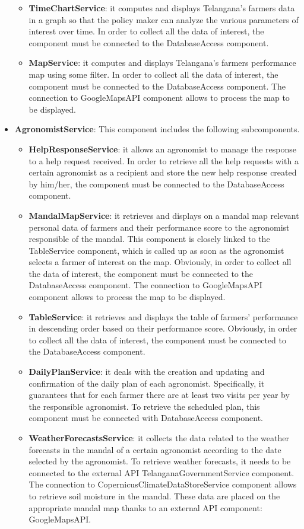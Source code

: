\begin{itemize}
\begin{itemize}
    \item \textbf{TimeChartService}: it computes and displays Telangana’s farmers data in a graph so that the policy maker can analyze the various parameters of interest over time.  In order to collect all the data of interest, the component must be connected to the DatabaseAccess component. 
    \item \textbf{MapService}: it computes and displays Telangana’s farmers performance map using some filter. In order to collect all the data of interest, the component must be connected to the DatabaseAccess component. The connection to GoogleMapsAPI component allows to process the map to be displayed. 
\end{itemize}

\item \textbf{AgronomistService}: This component includes the following subcomponents.

\begin{itemize}
    \item \textbf{HelpResponseService}: it allows an agronomist to manage the response to a help request received. In order to retrieve all the help requests with a certain agronomist as a recipient and store the new help response created by him/her, the component must be connected to the DatabaseAccess component. 
    \item \textbf{MandalMapService}: it retrieves and displays on a mandal map relevant personal data of farmers and their performance score to the agronomist responsible of the mandal. This component is closely linked to the TableService component, which is called up as soon as the agronomist selects a farmer of interest on the map. Obviously, in order to collect all the data of interest, the component must be connected to the DatabaseAccess component. 
    The connection to GoogleMapsAPI component allows to process the map to be displayed.
    \item \textbf{TableService}: it retrieves and displays the table of farmers’ performance in descending order based on their performance score. Obviously, in order to collect all the data of interest, the component must be connected to the DatabaseAccess component.
    \item \textbf{DailyPlanService}: it deals with the creation and updating and confirmation of the daily plan of each agronomist. Specifically, it guarantees that for each farmer there are at least two visits per year by the responsible agronomist. To retrieve the scheduled plan, this component must be connected with DatabaseAccess component.
    \item \textbf{WeatherForecastsService}: it collects the data related to the weather forecasts in the mandal of a certain agronomist according to the date selected by the agronomist. To retrieve weather forecasts, it needs to be connected to the external API TelanganaGovernmentService component. 
    The connection to CopernicusClimateDataStoreService component allows to retrieve soil moisture in the mandal.
    These data are placed on the appropriate mandal map thanks to an external API component: GoogleMapsAPI.
\end{itemize}


\end{itemize}
